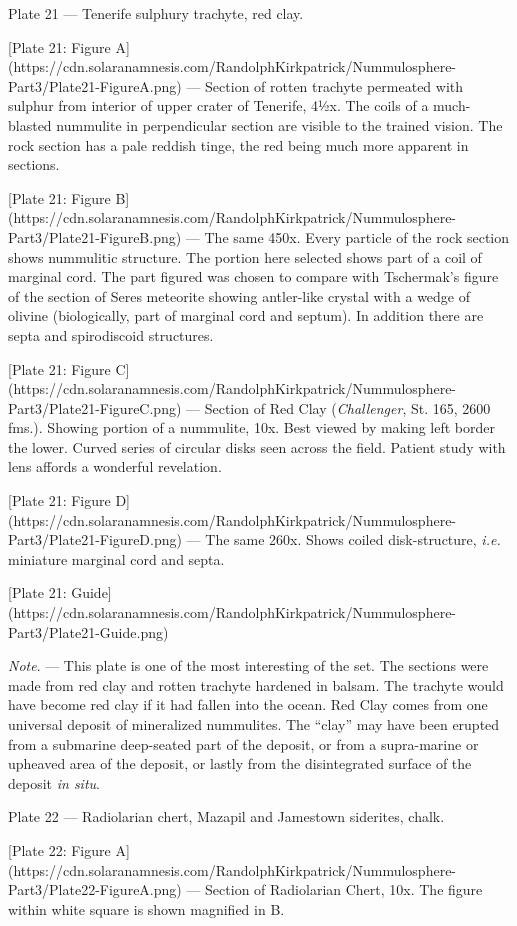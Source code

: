 \documentclass[a4paper, 12pt, oneside]{article}
\begin{document}
Plate 21 --- Tenerife sulphury trachyte, red clay.

[Plate 21: Figure A](https://cdn.solaranamnesis.com/RandolphKirkpatrick/Nummulosphere-Part3/Plate21-FigureA.png) --- Section of rotten trachyte permeated with sulphur from interior of upper crater of Tenerife, 4½x. The coils of a much-blasted nummulite in perpendicular section are visible to the trained vision. The rock section has a pale reddish tinge, the red being much more apparent in sections.

[Plate 21: Figure B](https://cdn.solaranamnesis.com/RandolphKirkpatrick/Nummulosphere-Part3/Plate21-FigureB.png) --- The same 450x. Every particle of the rock section shows nummulitic structure. The portion here selected shows part of a coil of marginal cord. The part figured was chosen to compare with Tschermak's figure of the section of Seres meteorite showing antler-like crystal with a wedge of olivine (biologically, part of marginal cord and septum). In addition there are septa and spirodiscoid structures.

[Plate 21: Figure C](https://cdn.solaranamnesis.com/RandolphKirkpatrick/Nummulosphere-Part3/Plate21-FigureC.png) --- Section of Red Clay (\emph{Challenger}, St. 165, 2600 fms.). Showing portion of a nummulite, 10x. Best viewed by making left border the lower. Curved series of circular disks seen across the field. Patient study with lens affords a wonderful revelation.

[Plate 21: Figure D](https://cdn.solaranamnesis.com/RandolphKirkpatrick/Nummulosphere-Part3/Plate21-FigureD.png) --- The same 260x. Shows coiled disk-structure, \emph{i.e.} miniature marginal cord and septa.

[Plate 21: Guide](https://cdn.solaranamnesis.com/RandolphKirkpatrick/Nummulosphere-Part3/Plate21-Guide.png)

\emph{Note}. --- This plate is one of the most interesting of the set. The sections were made from red clay and rotten trachyte hardened in balsam. The trachyte would have become red clay if it had fallen into the ocean. Red Clay comes from one universal deposit of mineralized nummulites. The ``clay'' may have been erupted from a submarine deep-seated part of the deposit, or from a supra-marine or upheaved area of the deposit, or lastly from the disintegrated surface of the deposit \emph{in situ}.

Plate 22 --- Radiolarian chert, Mazapil and Jamestown siderites, chalk.

[Plate 22: Figure A](https://cdn.solaranamnesis.com/RandolphKirkpatrick/Nummulosphere-Part3/Plate22-FigureA.png) --- Section of Radiolarian Chert, 10x. The figure within white square is shown magnified in B.
\end{document}
